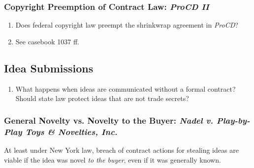 \subsubsection{Copyright Preemption of Contract Law: \emph{ProCD II}}

\begin{enumerate}
    \item Does federal copyright law preempt the shrinkwrap agreement in 
    \emph{ProCD}?
    \item See casebook 1037 ff.
\end{enumerate}

\subsection{Idea Submissions}

\begin{enumerate}
    \item What happens when ideas are communicated without a formal contract?  
    Should state law protect ideas that are not trade secrets?
\end{enumerate}

\subsubsection{General Novelty vs. Novelty to the Buyer: \emph{Nadel v.  
Play-by-Play Toys \& Novelties, Inc.}}

At least under New York law, breach of contract actions for stealing ideas are 
viable if the idea was novel \emph{to the buyer}, even if it was generally 
known.

